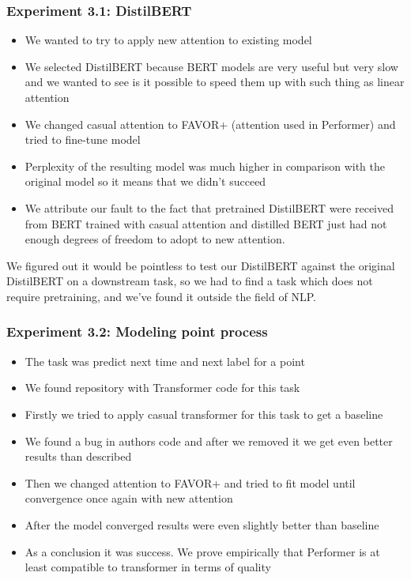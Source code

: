 \documentclass[9pt]{beamer}%
\begin{document}
\begin{frame}
\begin{columns}
	\end{columns}
	
\end{frame}

\begin{frame}
	\frametitle{Experiment 3.1: DistilBERT}
	
	\begin{itemize}
		\item We wanted to try to apply new attention to existing model
		\item We selected DistilBERT because BERT models are very useful but very slow and we wanted to see is it possible to speed them up with such thing as linear attention
		\item We changed casual attention to FAVOR+ (attention used in Performer) and tried to fine-tune model
		\item Perplexity of the resulting model was much higher in comparison with the original model so it means that we didn't succeed
		\item We attribute our fault to the fact that pretrained DistilBERT were received from BERT trained with casual attention and distilled BERT just had not enough degrees of freedom to adopt to new attention.
	\end{itemize}

	We figured out it would be pointless to test our DistilBERT against the original DistilBERT on a downstream task, so we had to find a task which does not require pretraining, and we’ve found it outside the field of NLP.
	
\end{frame}

\begin{frame}
	\frametitle{Experiment 3.2: Modeling point process}
	
	\begin{itemize}
		\item The task was predict next time and next label for a point
		\item We found repository with Transformer code for this task
		\item Firstly we tried to apply casual transformer for this task to get a baseline
		\item We found a bug in authors code and after we removed it we get even better results than described
		\item Then we changed attention to FAVOR+ and tried to fit model until convergence once again with new attention
		\item After the model converged results were even slightly better than baseline
		\item As a conclusion it was success. We prove empirically that Performer is at least compatible to transformer in terms of quality
	\end{itemize}
	
\end{frame}
\end{document}
